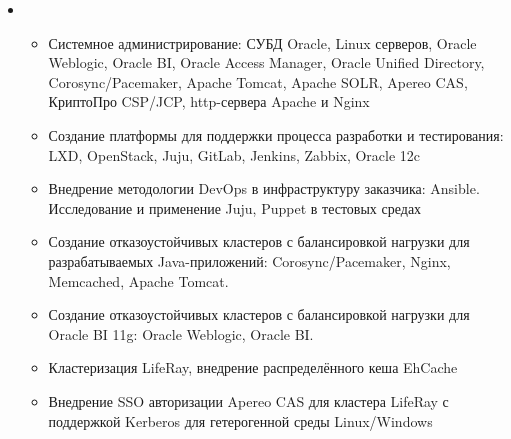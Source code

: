 \documentclass[11pt,a4paper,sans]{moderncv}        %
\begin{document}
{\begin{itemize}
\begin{itemize}
				{Analyzed and tuned Linux servers perfomance for Oracle RDBMS}
		\end{itemize}
	\item {}
		\begin{itemize}
			\item {}
				{Системное администрирование: СУБД Oracle, Linux серверов, Oracle Weblogic, Oracle BI, Oracle Access Manager, Oracle Unified Directory,
				Corosync/Pacemaker, Apache Tomcat, Apache SOLR, Apereo CAS, КриптоПро CSP/JCP, http-сервера Apache и Nginx}
				{}
			\item {}
				{Создание платформы для поддержки процесса разработки и тестирования: LXD, OpenStack, Juju, GitLab, Jenkins, Zabbix, Oracle 12c}
				{}
			\item {}
				{Внедрение методологии DevOps в инфраструктуру заказчика: Ansible. Исследование и применение Juju, Puppet в тестовых средах}
				{}
			\item {}
				{Создание отказоустойчивых кластеров с балансировкой нагрузки для разрабатываемых Java-приложений: Corosync/Pacemaker, Nginx, Memcached, Apache Tomcat.}
				{}
			\item {}
				{Создание отказоустойчивых кластеров с балансировкой нагрузки для Oracle BI 11g: Oracle Weblogic, Oracle BI.}
				{}
			\item {}
				{Кластеризация LifeRay, внедрение распределённого кеша EhCache}
				{}
			\item {}
				{Внедрение SSO авторизации Apereo CAS для кластера LifeRay с поддержкой Kerberos для гетерогенной среды Linux/Windows}
				{}
		\end{itemize}
	\end{itemize}
}
\end{document}
